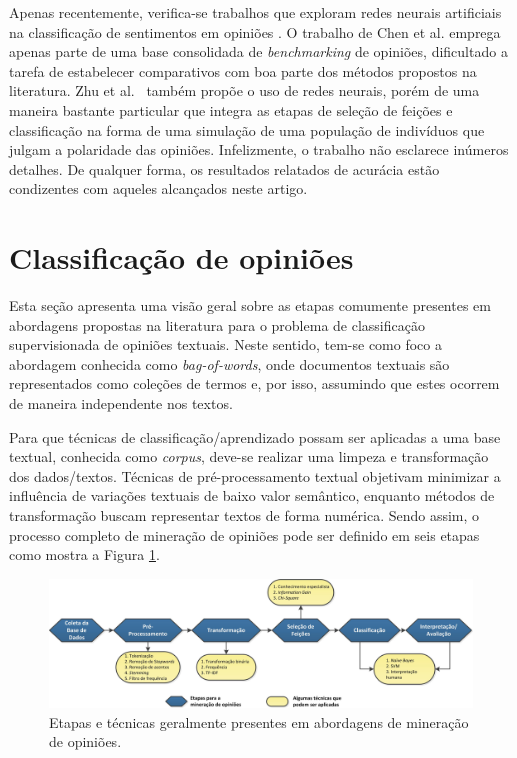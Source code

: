 \documentclass[11pt,a4paper]{article}
\begin{document}
Apenas recentemente, verifica-se trabalhos que exploram redes neurais artificiais na classificação de sentimentos em opiniões \cite{Chen:blogosphere,zhu:ANN}. O trabalho de Chen et al. \cite{Chen:blogosphere} emprega apenas parte de uma base consolidada de \textit{benchmarking} de opiniões, dificultado a tarefa de estabelecer comparativos com boa parte dos métodos propostos na literatura. Zhu et al.~\cite{zhu:ANN} também propõe o uso de redes neurais, porém de uma maneira bastante particular que integra as etapas de seleção de feições e classificação na forma de uma simulação de uma população de indivíduos que julgam a polaridade das opiniões. Infelizmente, o trabalho não esclarece inúmeros detalhes. De qualquer forma, os resultados relatados de acurácia estão condizentes com aqueles alcançados neste artigo.

\section{Classificação de opiniões}\label{sec:Fundamentos}

Esta seção apresenta uma visão geral sobre as etapas comumente presentes em abordagens propostas na literatura para o problema de classificação supervisionada de opiniões textuais. Neste sentido, tem-se como foco a abordagem conhecida como \textit{bag-of-words}, onde documentos textuais são representados como coleções de termos e, por isso, assumindo que estes ocorrem de maneira independente nos textos.

Para que técnicas de classificação/aprendizado possam ser aplicadas a uma base textual, conhecida como \textit{corpus}, deve-se realizar uma limpeza e transformação dos dados/textos. Técnicas de pré-processamento textual objetivam minimizar a influência de variações textuais de baixo valor semântico, enquanto métodos de transformação buscam representar textos de forma numérica. Sendo assim, o processo completo de mineração de opiniões pode ser definido em seis etapas como mostra a Figura \ref{fig:processo}.



\begin{figure}[h]
\begin{center}
\includegraphics[width=1\textwidth]{diagrama.jpg}
\caption{Etapas e técnicas geralmente presentes em abordagens de mineração de opiniões.\label{fig:processo}}
\end{center}
\end{figure}
\end{document}
